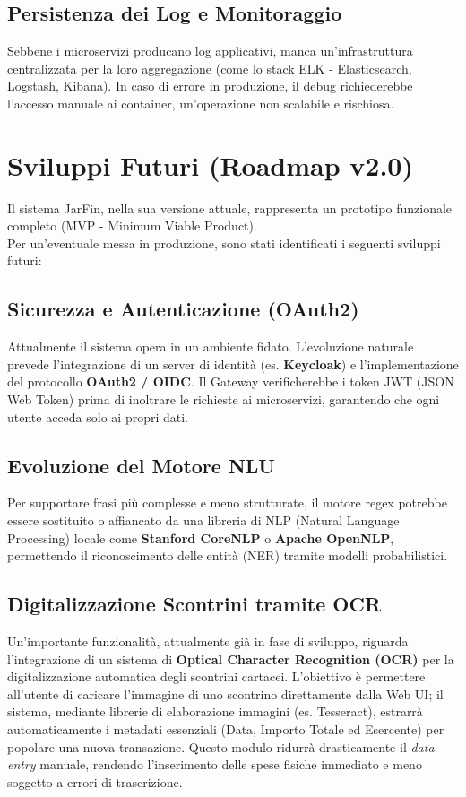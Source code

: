 \subsection{Persistenza dei Log e Monitoraggio}
Sebbene i microservizi producano log applicativi, manca un'infrastruttura centralizzata per la loro aggregazione (come lo stack ELK - Elasticsearch, Logstash, Kibana). In caso di errore in produzione, il debug richiederebbe l'accesso manuale ai container, un'operazione non scalabile e rischiosa.

\section{Sviluppi Futuri (Roadmap v2.0)}

Il sistema JarFin, nella sua versione attuale, rappresenta un prototipo funzionale completo (MVP - Minimum Viable Product). \\
Per un'eventuale messa in produzione, sono stati identificati i seguenti sviluppi futuri:

\subsection{Sicurezza e Autenticazione (OAuth2)}
Attualmente il sistema opera in un ambiente fidato. L'evoluzione naturale prevede l'integrazione di un server di identità (es. \textbf{Keycloak}) e l'implementazione del protocollo \textbf{OAuth2 / OIDC}.
Il Gateway verificherebbe i token JWT (JSON Web Token) prima di inoltrare le richieste ai microservizi, garantendo che ogni utente acceda solo ai propri dati.

\subsection{Evoluzione del Motore NLU}
Per supportare frasi più complesse e meno strutturate, il motore regex potrebbe essere sostituito o affiancato da una libreria di NLP (Natural Language Processing) locale come \textbf{Stanford CoreNLP} o \textbf{Apache OpenNLP}, permettendo il riconoscimento delle entità (NER) tramite modelli probabilistici.

\subsection{Digitalizzazione Scontrini tramite OCR}
Un'importante funzionalità, attualmente già in fase di sviluppo, riguarda l'integrazione di un sistema di \textbf{Optical Character Recognition (OCR)} per la digitalizzazione automatica degli scontrini cartacei.
L'obiettivo è permettere all'utente di caricare l'immagine di uno scontrino direttamente dalla Web UI; il sistema, mediante librerie di elaborazione immagini (es. Tesseract), estrarrà automaticamente i metadati essenziali (Data, Importo Totale ed Esercente) per popolare una nuova transazione.
Questo modulo ridurrà drasticamente il \textit{data entry} manuale, rendendo l'inserimento delle spese fisiche immediato e meno soggetto a errori di trascrizione.

